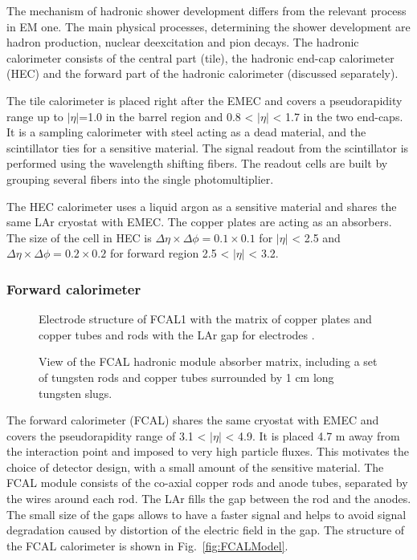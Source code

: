 The mechanism of hadronic shower development differs from the relevant process in EM one. The main physical processes, determining the shower development are hadron production, nuclear deexcitation and pion decays. The \atlas hadronic calorimeter consists of the central part (tile), the hadronic end-cap calorimeter (HEC) and the forward part of the hadronic calorimeter (discussed separately).

The tile calorimeter is placed right after the EMEC and covers a pseudorapidity range up to $|\eta|$=1.0 in the barrel region and 0.8 < $|\eta|$ < 1.7 in the two end-caps. It is a sampling calorimeter with steel acting as a dead material, and the scintillator ties for a sensitive material. The signal readout from the scintillator is performed using the wavelength shifting fibers.  The readout cells are built by grouping several fibers into the single photomultiplier.

The HEC calorimeter uses a liquid argon as a sensitive material and shares the same LAr cryostat with EMEC. The copper plates are acting as an absorbers. The size of the cell in HEC is $\Delta \eta \times \Delta \phi = 0.1 \times 0.1$ for $|\eta|$ < 2.5 and $\Delta \eta \times \Delta \phi = 0.2 \times 0.2$ for forward region 2.5 < $|\eta|$ < 3.2.


\subsubsection{Forward calorimeter}


\begin{figure}[!tb]
\begin{minipage}[h]{0.45\linewidth}
\caption{Electrode structure of FCAL1 with the matrix of copper plates and copper tubes and rods with the LAr gap for electrodes \cite{AtlasExperiment}.}
\label{fig:FCALModel}
\end{minipage}
\hfill
\begin{minipage}[h]{0.49\linewidth}
\caption{View of the FCAL hadronic module absorber matrix, including a set of tungsten rods and copper tubes surrounded by 1 cm long tungsten slugs\cite{AtlasExperiment}.}
\label{fig:FCAL2}
\end{minipage}
\end{figure}


The forward calorimeter (FCAL) shares the same cryostat with EMEC and covers the pseudorapidity range of  3.1 < $|\eta|$ < 4.9. It is placed 4.7 m away from the interaction point and imposed to very high particle fluxes. This motivates the choice of detector design, with a small amount of the sensitive material.  The FCAL module consists of the co-axial copper rods and anode tubes, separated by the wires around each rod. The LAr fills the gap between the rod and the anodes. The small size of the gaps allows to have a faster signal and helps to avoid signal degradation caused by distortion of the electric field in the gap. The structure of the FCAL calorimeter is shown in Fig.~\ref{fig:FCALModel}.

